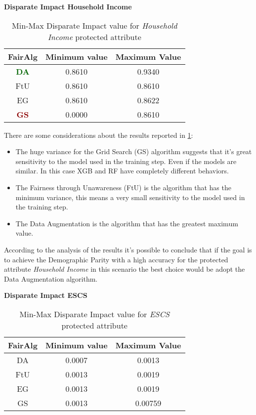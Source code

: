 \textbf{Disparate Impact Household Income}
\begin{table}
    \centering
    \begin{tabular}{|c|c|c|}
        \hline
        \textbf{FairAlg} & \textbf{Minimum value} & \textbf{Maximum Value} \\
        \hline
        \textcolor{darkgreen}{\textbf{DA}} & 0.8610 & 0.9340 \\
        \hline
        FtU & 0.8610 & 0.8610 \\
        \hline
        EG & 0.8610 & 0.8622 \\
        \hline
        \textcolor{darkred}{\textbf{GS}} & 0.0000 & 0.8610 \\
        \hline
    \end{tabular}
    \caption{Min-Max Disparate Impact value for \emph{Household Income} protected attribute}
    \label{tab:h_di}
\end{table}

There are some considerations about the results reported in \cref{tab:h_di}:

\begin{itemize}

    \item The huge variance for the Grid Search (GS) algorithm suggests that it's great sensitivity to the model used in the training step. Even if the models are similar. In this case XGB and RF have completely different behaviors.

    \item The Fairness through Unawareness (FtU) is the algorithm that has the minimum variance, this means a very small sensitivity to the model used in the training step.

    \item The Data Augmentation is the algorithm that has the greatest maximum value.

\end{itemize}

According to the analysis of the results it's possible to conclude that if the goal is to achieve the Demographic Parity with a high accuracy for the protected attribute \emph{Household Income} in this scenario the best choice would be adopt the Data Augmentation algorithm.

\textbf{Disparate Impact ESCS}
\begin{table}
    \centering
    \begin{tabular}{|c|c|c|}
        \hline
        \textbf{FairAlg} & \textbf{Minimum value} & \textbf{Maximum Value} \\
        \hline
        DA & 0.0007 & 0.0013 \\
        \hline
        FtU & 0.0013 & 0.0019 \\
        \hline
        EG & 0.0013 & 0.0019 \\
        \hline
        GS & 0.0013 & 0.00759 \\
        \hline
    \end{tabular}
    \caption{Min-Max Disparate Impact value for \emph{ESCS} protected attribute}
    \label{tab:e_di}
\end{table}

